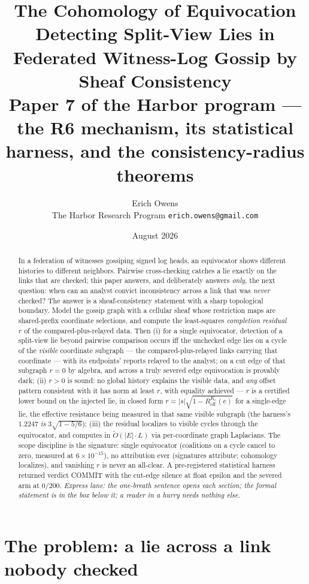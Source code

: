 \documentclass[11pt,a4paper]{article}
\title{\textbf{The Cohomology of Equivocation}\\[4pt]
\large Detecting Split-View Lies in Federated Witness-Log Gossip by Sheaf Consistency\\[3pt]
\normalsize Paper 7 of the Harbor program --- the R6 mechanism, its statistical harness, and the consistency-radius theorems}
\author{Erich Owens\\ \normalsize The Harbor Research Program \quad \texttt{erich.owens@gmail.com}}
\date{August 2026}
\begin{document}
\maketitle

\begin{abstract}
\noindent In a federation of witnesses gossiping signed log heads, an equivocator shows different histories to different
neighbors. Pairwise cross-checking catches a lie exactly on the links that are checked; this paper answers, and deliberately
answers \emph{only}, the next question: when can an analyst convict inconsistency across a link that was \emph{never} checked?
The answer is a sheaf-consistency statement with a sharp topological boundary. Model the gossip graph with a cellular sheaf whose
restriction maps are shared-prefix coordinate selections, and compute the least-squares \emph{completion residual} $r$ of the
compared-plus-relayed data. Then (i) for a single equivocator, detection of a split-view lie beyond pairwise comparison occurs
iff the unchecked edge lies on a cycle of the \emph{visible} coordinate subgraph --- the compared-plus-relayed links carrying
that coordinate --- with its endpoints' reports relayed to the analyst; on a cut edge of that subgraph $r=0$ by algebra, and
across a truly severed edge equivocation is provably dark; (ii) $r>0$ is sound: no global history explains the visible data, and \emph{any} offset pattern consistent with it
has norm at least $r$, with equality achieved --- $r$ is a certified lower bound on the injected lie, in closed form
$r=|s|\sqrt{1-R^{K_c}_{\mathrm{eff}}(e)}$ for a single-edge lie, the effective resistance being measured in that same
visible subgraph (the harness's $1.2247$ \emph{is} $3\sqrt{1-5/6}$); (iii) the residual
localizes to visible cycles through the equivocator, and computes in $\widetilde{O}(|E|\cdot L)$ via per-coordinate graph Laplacians. The
scope discipline is the signature: single equivocator (coalitions on a cycle cancel to zero, measured at $6\times10^{-15}$), no
attribution ever (signatures attribute; cohomology localizes), and vanishing $r$ is never an all-clear. A pre-registered
statistical harness returned verdict COMMIT with the cut-edge silence at float epsilon and the severed arm at $0/200$.
\emph{Express lane: the one-breath sentence opens each section; the formal statement is in the box below it; a reader in a hurry
needs nothing else.}
\end{abstract}

\section{The problem: a lie across a link nobody checked}\label{sec:problem}
\end{document}
